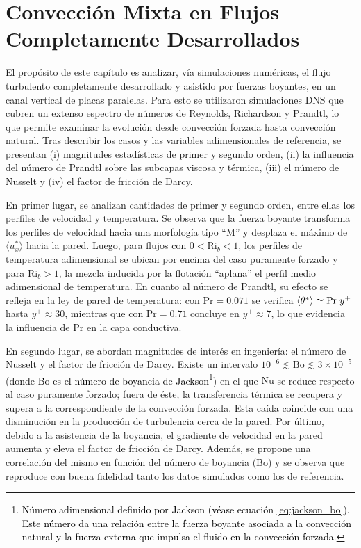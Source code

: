 \chapter{Convección Mixta en Flujos Completamente Desarrollados} \label{cap:desarrollado}

El propósito de este capítulo es analizar, vía simulaciones numéricas, el flujo turbulento completamente desarrollado y asistido por fuerzas boyantes, en un canal vertical de placas paralelas. Para esto se utilizaron simulaciones DNS que cubren un extenso espectro de números de Reynolds, Richardson y Prandtl, lo que permite examinar la evolución desde convección forzada hasta convección natural. Tras describir los casos y las variables adimensionales de referencia, se presentan (i) magnitudes estadísticas de primer y segundo orden, (ii) la influencia del número de Prandtl sobre las subcapas viscosa y térmica, (iii) el número de Nusselt y (iv) el factor de fricción de Darcy.

En primer lugar, se analizan cantidades de primer y segundo orden, entre ellas los perfiles de velocidad y temperatura. Se observa que la fuerza boyante transforma los perfiles de velocidad hacia una morfología tipo “M” y desplaza el máximo de $\langle u_x^* \rangle$ hacia la pared. Luego, para flujos con $0 < \text{Ri}_b < 1$, los perfiles de temperatura adimensional se ubican por encima del caso puramente forzado y para $\text{Ri}_b>1$, la mezcla inducida por la flotación “aplana” el perfil medio adimensional de temperatura. En cuanto al número de Prandtl, su efecto se refleja en la ley de pared de temperatura: con $\text{Pr}=0\text{.}071$ se verifica $\langle \theta^{*} \rangle \simeq \text{Pr} \hspace{1mm} y^+$ hasta $y^+ \approx 30$, mientras que con $\text{Pr}=0\text{.}71$ concluye en $y^+ \approx 7$, lo que evidencia la influencia de $\text{Pr}$ en la capa conductiva. 

En segundo lugar, se abordan magnitudes de interés en ingeniería: el número de Nusselt y el factor de fricción de Darcy. Existe un intervalo $10^{-6} \lesssim \text{Bo} \lesssim 3\times10^{-5}$ (\textcolor{black}{donde Bo es el número de boyancia de Jackson}\footnote{\textcolor{black}{Número adimensional definido por Jackson \cite{jackson1989studies} (véase ecuación \ref{eq:jackson_bo}). Este número da una relación entre la fuerza boyante asociada a la convección natural y la fuerza externa que impulsa el fluido en la convección forzada.}}) en el que $\text{Nu}$ se reduce respecto al caso puramente forzado; fuera de éste, la transferencia térmica se recupera y supera a la correspondiente de la convección forzada. Esta caída coincide con una disminución en la producción de turbulencia cerca de la pared. Por último, debido a la asistencia de la boyancia, el gradiente de velocidad en la pared aumenta y eleva el factor de fricción de Darcy. Además, se propone una correlación del mismo en función del número de boyancia (Bo) y se observa que reproduce con buena fidelidad tanto los datos simulados como los de referencia.


